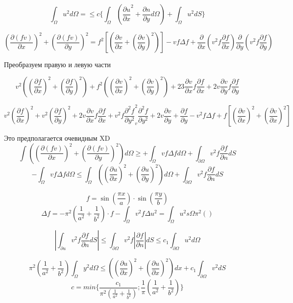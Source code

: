 \documentclass[12pt, a4paper]{article}
\begin{document}
\[ \int_{\Omega}^{} u^2 d \Omega = \leq c \{ \int_{\Omega}^{}(\frac{\partial u }{\partial x}^2+\frac{\partial n}{\partial y} d\Omega) + \int_{\Omega}^{} u^2 dS \} \]

\[ (\frac{\partial(fv)}{\partial x})^2 + (\frac{\partial (fv)}{\partial y})^2 = f^2 [(\frac{\partial v}{\partial x} + (\frac{\partial v}{\partial y})^2)] - v f\Delta f + \frac{\partial}{\partial x}(v^2 f \frac{\partial f }{\partial x}) \frac{\partial}{\partial y} (v^2 f \frac{\partial f}{\partial y}) \]

Преобразуем правую и левую части

\[ v^2 ((\frac{\partial f}{\partial x})^2+(\frac{\partial f}{\partial y})^2) + f^2 ((\frac{\partial v}{\partial x})^2 + (\frac{\partial v}{\partial y})^2) + 23\frac{\partial v}{\partial x} f \frac{\partial f}{\partial x} + 2v\frac{\partial v }{\partial y} f \frac{\partial f}{\partial y} \]

\[ v^2 (\frac{\partial  f}{\partial x})^2 + v^2 (\frac{\partial  f}{\partial y})^2 + 2v\frac{\partial v}{\partial x}f\frac{\partial  f}{\partial x} + v^2 f \frac{\partial^2 f}{\partial y^2} _ v^2 \frac{\partial^2 f}{\partial y^2} + 2v \frac{\partial v}{\partial y} + \frac{\partial f}{\partial y} - v^2 f \Delta f + f[(\frac{\partial v}{\partial  x})^2+ (\frac{\partial v}{\partial x})^2] \]

Это предполагается очевидным XD
\[ \int_{}^{} ((\frac{\partial (fv)}{\partial x})^2 + (\frac{\partial (fv)}{\partial y})^2) d\Omega \geq + \int_{\Omega}^{}vf\Delta f d \Omega + \int_{\partial \Omega}^{}v^2 f \frac{\partial f}{\partial  n} dS \]
\[ -\int_{\Omega}^{} vf \Delta f d\Omega \leq \int_{\Omega}^{} ((\frac{\partial u}{\partial x})^2 + (\frac{\partial u}{\partial y})^2) d \Omega + \int_{\partial \Omega}^{} v^2 f \frac{\partial f}{\partial n}d S \]

\[ f = \sin (\frac{\pi x}{a})\cdot \sin (\frac{\pi y }{b}) \]
\[ \Delta f = - \pi^2 (\frac{1}{a^2} + \frac{1}{b^2})\cdot f- \int_{\Omega}^{}v^2 f \Delta u^2 = \int_{\Omega}^{} u^2 s\Omega \pi^2 ()  \]

\[ |\int_{\partial u}^{}v^2 f \frac{\partial f}{\partial n} dS| \leq \int_{\partial  \Omega}^{} v^2 f |\frac{\partial f}{\partial n}|dS \leq c_1 \int_{\partial \Omega}^{} u^2 d \Omega \]

\[ \pi^2 (\frac{1}{a^2} + \frac{1}{b^2}) \int_{\Omega}^{} y^2 d\Omega \leq ((\frac{\partial u}{\partial x})^2 +(\frac{\partial u}{\partial x})^2) dx + c_1 \int_{\partial \Omega}^{} v^2 dS \]
\[ c= min \{\frac{c_1}{\pi^2(\frac{1}{a^2}+\frac{1}{b^2})}; \frac{1}{\pi}(\frac{1}{a^2}+\frac{1}{b^2})\} \]
\end{document}
